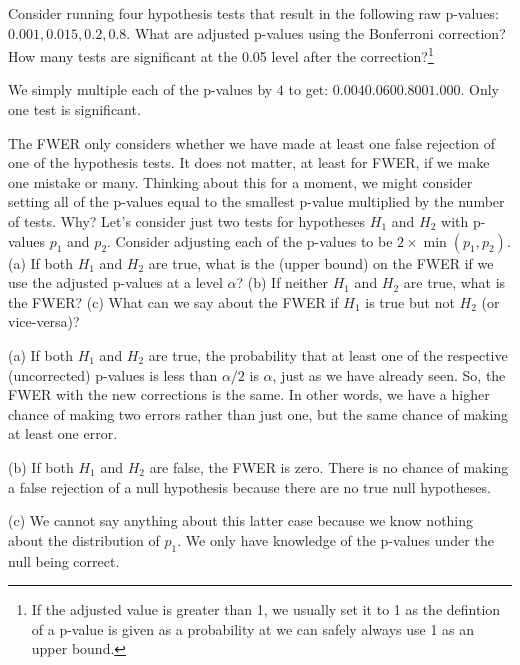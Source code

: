 
Consider running four hypothesis tests that result in the following raw
p-values: $0.001, 0.015, 0.2, 0.8$. What are adjusted p-values using the
Bonferroni correction? How many tests are significant at the 0.05 level
after the correction?\footnote{
  If the adjusted value is greater than 1, we usually set it
  to 1 as the defintion of a p-value is given as a probability
  at we can safely always use 1 as an upper bound.
}



We simply multiple each of the p-values by $4$ to get: 
$0.004 0.060 0.800 1.000$. Only one test is significant.


The FWER only considers whether we have made at least one false rejection
of one of the hypothesis tests. It does not matter, at least for FWER, if
we make one mistake or many. Thinking about this for a moment, we might
consider setting all of the p-values equal to the smallest p-value multiplied
by the number of tests. Why? Let's consider just two tests for hypotheses
$H_1$ and $H_2$ with p-values $p_1$ and $p_2$. Consider adjusting each 
of the p-values to be $2 \times \min(p_1, p_2)$. (a) If both $H_1$ and $H_2$
are true, what is the (upper bound) on the FWER if we use the adjusted
p-values at a level $\alpha$? (b) If neither $H_1$ and $H_2$ are true,
what is the FWER? (c) What can we say about the FWER if $H_1$ is true
but not $H_2$ (or vice-versa)?


(a) If both $H_1$ and $H_2$ are true, the probability that at least one
of the respective (uncorrected) p-values is less than $\alpha / 2$ is
$\alpha$, just as we have already seen. So, the FWER with the new corrections
is the same. In other words, we have a higher chance of making two errors
rather than just one, but the same chance of making at least one error.

(b) If both $H_1$ and $H_2$ are false, the FWER is zero. There is no
chance of making a false rejection of a null hypothesis because there
are no true null hypotheses.

(c) We cannot say anything about this latter case because we know nothing
about the distribution of $p_1$. We only have knowledge of the p-values 
under the null being correct. 


